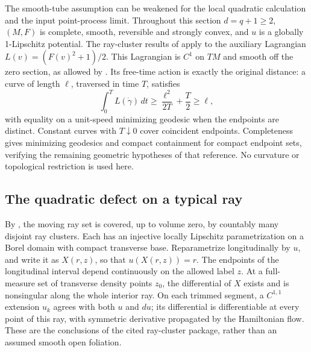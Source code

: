 \documentclass[11pt,reqno]{amsart}
\theoremstyle{definition}
\theoremstyle{remark}
\numberwithin{equation}{section}
\begin{document}
The smooth-tube assumption can be weakened for the local quadratic
calculation and the input point-process limit. Throughout this section
\(d=q+1\ge2\), \((M,F)\) is complete, smooth, reversible and strongly
convex, and \(u\) is a globally 1-Lipschitz potential. The ray-cluster
results of \cite[Theorem~4.11, Proposition~4.18 and Lemma~4.21]{Assouline}
apply to the auxiliary Lagrangian \(L(v)=(F(v)^2+1)/2\).
This Lagrangian is \(C^1\) on \(TM\) and smooth off the zero
section, as allowed by \cite[Definition~2.1 and Example~2.6]{Assouline}.
Its free-time action is exactly the original distance: a curve of
length \(\ell\), traversed in time \(T\), satisfies
\[
\int_0^T L(\dot\gamma)\,dt
\ge \frac{\ell^2}{2T}+\frac T2\ge\ell,
\]
with equality on a unit-speed minimizing geodesic when the endpoints
are distinct. Constant curves with \(T\downarrow0\) cover coincident
endpoints. Completeness gives minimizing geodesics and compact
containment for compact endpoint sets, verifying the remaining
geometric hypotheses of that reference. No curvature or topological
restriction is used here.

\subsection{The quadratic defect on a typical ray}

By \cite[Lemma~4.23]{Assouline}, the moving ray set is covered, up to
volume zero, by countably many disjoint ray clusters. Each has an
injective locally Lipschitz parametrization on a Borel domain with
compact transverse base. Reparametrize longitudinally by \(u\), and
write it as \(X(r,z)\), so that \(u(X(r,z))=r\). The endpoints of the
longitudinal interval depend continuously on the allowed label \(z\).
At a full-measure set of transverse density points \(z_0\), the
differential of \(X\) exists and is nonsingular along the whole
interior ray. On each trimmed segment, a \(C^{1,1}\) extension \(u_k\)
agrees with both \(u\) and \(du\); its differential is differentiable
at every point of this ray, with symmetric derivative propagated by
the Hamiltonian flow. These are the conclusions of the cited
ray-cluster package, rather than an assumed smooth open foliation.
\end{document}
